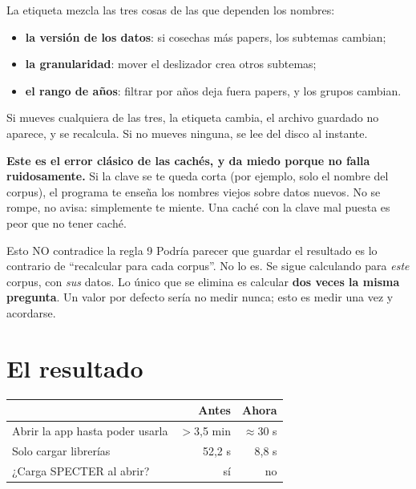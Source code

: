 \documentclass[11pt,a4paper]{article}
\begin{document}
La etiqueta mezcla las tres cosas de las que dependen los nombres:

\begin{itemize}
  \item \textbf{la versión de los datos}: si cosechas más papers, los subtemas cambian;
  \item \textbf{la granularidad}: mover el deslizador crea otros subtemas;
  \item \textbf{el rango de años}: filtrar por años deja fuera papers, y los grupos cambian.
\end{itemize}

Si mueves cualquiera de las tres, la etiqueta cambia, el archivo guardado no aparece, y
se recalcula. Si no mueves ninguna, se lee del disco al instante.

\begin{ojo}
\textbf{Este es el error clásico de las cachés, y da miedo porque no falla ruidosamente.}
Si la clave se te queda corta (por ejemplo, solo el nombre del corpus), el programa te
enseña los nombres viejos sobre datos nuevos. No se rompe, no avisa: simplemente te
miente. Una caché con la clave mal puesta es peor que no tener caché.
\end{ojo}

\begin{concepto}{Esto NO contradice la regla 9}
Podría parecer que guardar el resultado es lo contrario de ``recalcular para cada
corpus''. No lo es. Se sigue calculando para \emph{este} corpus, con \emph{sus} datos.
Lo único que se elimina es calcular \textbf{dos veces la misma pregunta}. Un valor por
defecto sería no medir nunca; esto es medir una vez y acordarse.
\end{concepto}

\section{El resultado}

\begin{center}
\begin{tabular}{lrr}
\hline
 & \textbf{Antes} & \textbf{Ahora} \\
\hline
Abrir la app hasta poder usarla & $>$3,5 min & $\approx$30 s \\
Solo cargar librerías           & 52,2 s     & 8,8 s \\
¿Carga SPECTER al abrir?        & sí         & no \\
\hline
\end{tabular}
\end{center}
\end{document}
